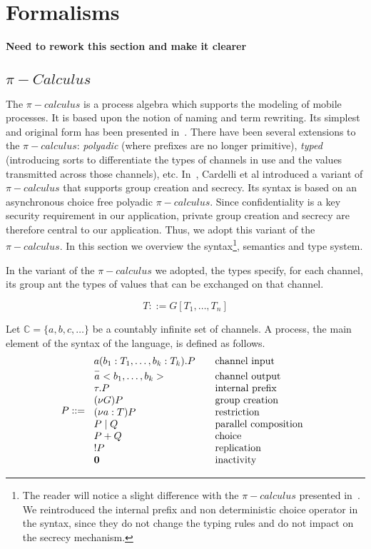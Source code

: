 \section{Formalisms} %
\label{sec:formalisms}

\textbf{Need to rework this section and make it clearer }

\subsection{$\pi-Calculus$} %
\label{sub:_pi_calculus_}

The $\pi-calculus$ is a process algebra which supports the modeling of mobile processes. It is based upon the notion of
naming and term rewriting. Its simplest and original form has been presented in~\cite{Milner-Parrow-Walker:89}. There
have been several extensions to the $\pi-calculus$: \emph{polyadic} (where prefixes are no longer primitive),
\emph{typed} (introducing sorts to differentiate the types of channels in use and the values transmitted across those
channels), etc. In~\cite{Cardelli-Ghelli-Gordon:05}, Cardelli et al introduced a variant of $\pi-calculus$ that supports
group creation and secrecy. Its syntax is based on an asynchronous choice free polyadic $\pi-calculus$. Since
confidentiality is a key security requirement in our application, private group creation and secrecy are therefore
central to our application. Thus, we adopt this variant of the $\pi-calculus$. In this section we overview the
syntax\footnote{The reader will notice a slight difference with the $\pi-calculus$ presented
in~\cite{Cardelli-Ghelli-Gordon:05}. We reintroduced the internal prefix and non deterministic choice operator in the
syntax, since they do not change the typing rules and do not impact on the secrecy mechanism.}, semantics and type
system.

In the variant of the $\pi-calculus$ we adopted, the types specify, for each channel, its group ant the types of values
that can be exchanged on that channel.

\begin{displaymath}
	T::=G[T_1,\ldots, T_n]
\end{displaymath}

Let $\mathbb{C}=\{a,b,c,\ldots\}$ be a countably infinite set of channels. A process, the main element of the syntax of the language, is defined as follows. 
\[
P::= \left. \begin{array}{l l}
a(b_1:T_1,\ldots,b_k:T_k).P & \quad \mbox{channel input}\\
\overset{-}{a}<b_1,\ldots,b_k> & \quad \mbox{channel output}\\
\tau.P & \quad \mbox{internal prefix}\\
(\nu G)P & \quad \mbox{group creation}\\
(\nu a:T)P & \quad \mbox{restriction}\\
P\mid Q & \quad \mbox{parallel composition}\\
P + Q & \quad \mbox{choice}\\
!P & \quad \mbox{replication}\\
\mathbf{0} & \quad \mbox{inactivity}\\
\end{array} \right.
\]

